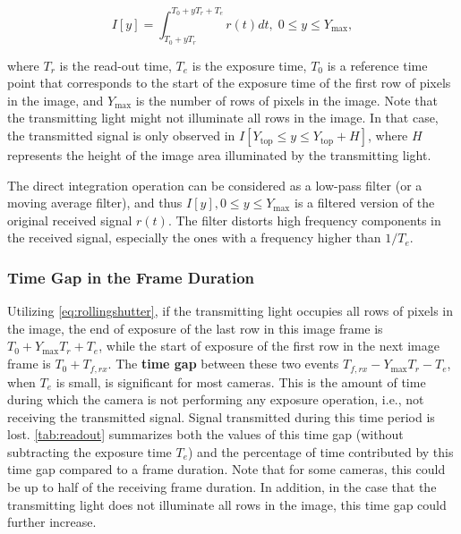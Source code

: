 \begin{equation}
	I[y]=\int^{T_0+y T_r+T_e}_{T_0+y T_r} r(t) dt, \; 0 \leq y \leq Y_{\max},
	\label{eq:rollingshutter}
\end{equation}

where $T_r$ is the read-out time, $T_e$ is the exposure time, $T_0$ is a reference time point that corresponds to the start of the exposure time of the first row of pixels in the image, and $Y_{\max}$ is the number of rows of pixels in the image. Note that the transmitting light might not illuminate all rows in the image. In that case, the transmitted signal is only observed in $I[Y_{\operatorname{top}} \leq y \leq Y_{\operatorname{top}}+H]$, where $H$ represents the height of the image area illuminated by the transmitting light.

The direct integration operation can be considered as a low-pass filter (or a moving average filter), and thus $I[y], 0 \leq y \leq Y_{\max}$ is a filtered version of the original received signal $r(t)$. The filter distorts high frequency components in the received signal, especially the ones with a frequency higher than $1/T_e$.

\subsubsection{Time Gap in the Frame Duration}
Utilizing \autoref{eq:rollingshutter}, if the transmitting light occupies all rows of pixels in the image, the end of exposure of the last row in this image frame is $T_0 + Y_{\max} T_r + T_e$, while the start of exposure of the first row in the next image frame is $T_0 + T_{f,rx}$. The \textbf{time gap} between these two events $T_{f,rx} - Y_{\max} T_r - T_e$, when $T_e$ is small, is significant for most cameras.
This is the amount of time during which the camera is not performing any exposure operation, i.e., not receiving the transmitted signal. Signal transmitted during this time period is lost. \autoref{tab:readout} summarizes both the values of this time gap (without subtracting the exposure time $T_e$) and the percentage of time contributed by this time gap compared to a frame duration. Note that for some cameras, this could be up to half of the receiving frame duration. In addition, in the case that the transmitting light does not illuminate all rows in the image, this time gap could further increase.


